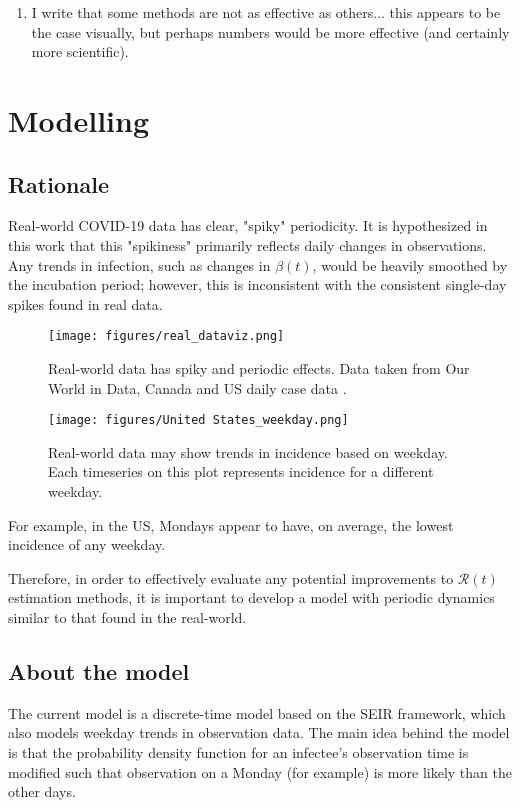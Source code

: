 \documentclass{article}
\newcommand{\nR}{\mathscr{R}}
\begin{document}
\begin{enumerate}
	\item I write that some methods are not as effective as others... this appears to be the case visually, but perhaps numbers would be more effective (and certainly more scientific). 
\end{enumerate}


\section{Modelling}

\subsection{Rationale}
Real-world COVID-19 data has clear, "spiky" periodicity. It is hypothesized in this work that this "spikiness" primarily reflects daily changes in observations. Any trends in infection, such as changes in $\beta(t)$, would be heavily smoothed by the incubation period; however, this is inconsistent with the consistent single-day spikes found in real data. 

\clearpage
\begin{figure}
    \centering
    \texttt{[image: figures/real\_dataviz.png]}
    \caption{Real-world data has spiky and periodic effects. Data taken from Our World in Data, Canada and US daily case data \cite{OWID}.}
    \label{fig:my_label}
\end{figure}

\clearpage
\begin{figure}
	\centering
    \texttt{[image: figures/United States\_weekday.png]}
    \caption{Real-world data may show trends in incidence based on weekday. Each timeseries on this plot represents incidence for a different weekday. }
    \label{fig:my_label}
\end{figure}

For example, in the US, Mondays appear to have, on average, the lowest incidence of any weekday.

Therefore, in order to effectively evaluate any potential improvements to $\nR(t)$ estimation methods, it is important to develop a model with periodic dynamics similar to that found in the real-world. 

\subsection{About the model}
The current model is a discrete-time model based on the SEIR framework, which also models weekday trends in observation data. The main idea behind the model is that the probability density function for an infectee's observation time is modified such that observation on a Monday (for example) is more likely than the other days.
\end{document}
